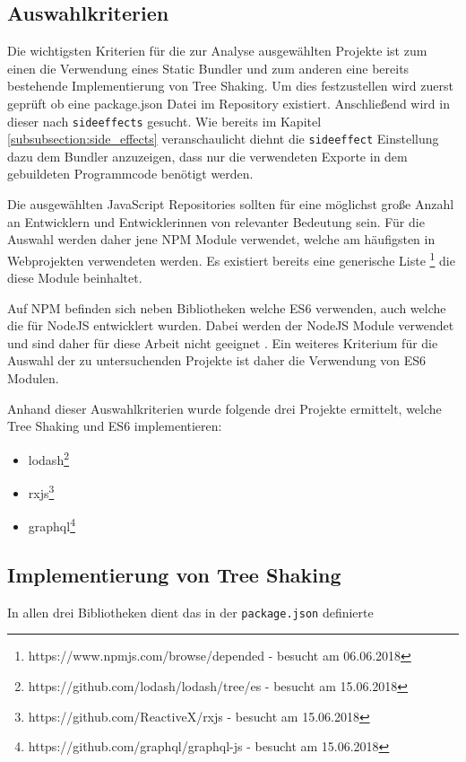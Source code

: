 \subsection{Auswahlkriterien}
Die wichtigsten Kriterien für die zur Analyse ausgewählten Projekte ist zum einen die Verwendung eines Static Bundler und zum anderen eine bereits bestehende Implementierung von Tree Shaking. Um dies festzustellen wird zuerst geprüft ob eine package.json Datei im Repository existiert. Anschließend wird in dieser nach \lstinline{sideeffects} gesucht. Wie bereits im Kapitel \ref{subsubsection:side_effects} veranschaulicht diehnt die \lstinline{sideeffect} Einstellung dazu dem Bundler anzuzeigen, dass nur die verwendeten Exporte in dem gebuildeten Programmcode benötigt werden.

Die ausgewählten JavaScript Repositories sollten  für eine möglichst große Anzahl an Entwicklern und Entwicklerinnen von relevanter Bedeutung sein. Für die Auswahl werden daher jene NPM Module verwendet, welche am häufigsten in Webprojekten verwendeten werden. Es existiert bereits eine generische Liste \footnote{https://www.npmjs.com/browse/depended - besucht am 06.06.2018} die diese Module beinhaltet.

Auf NPM befinden sich neben Bibliotheken welche ES6 verwenden, auch welche die für NodeJS entwicklert wurden. Dabei werden der NodeJS Module verwendet und sind daher für diese Arbeit nicht geeignet \autocite{NodeJSModules}. Ein weiteres Kriterium für die Auswahl der zu untersuchenden Projekte ist daher die Verwendung von ES6 Modulen.

Anhand dieser Auswahlkriterien wurde folgende drei Projekte ermittelt, welche Tree Shaking und ES6  implementieren:

\begin{itemize}
	\item{lodash\footnote{https://github.com/lodash/lodash/tree/es - besucht am 15.06.2018}}
	\item{rxjs\footnote{https://github.com/ReactiveX/rxjs - besucht am 15.06.2018}}
	\item{graphql\footnote{https://github.com/graphql/graphql-js - besucht am 15.06.2018}}
\end{itemize}


\subsection{Implementierung von Tree Shaking}
In allen drei Bibliotheken dient das in der \lstinline{package.json} definierte 


